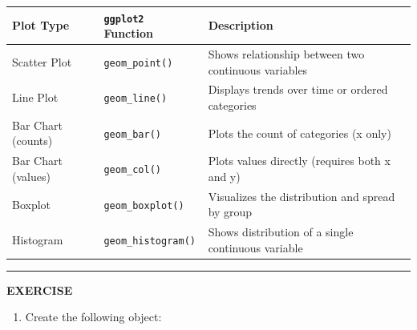 \documentclass[
]{book}
\providecommand{\tightlist}{%
  \setlength{\itemsep}{0pt}\setlength{\parskip}{0pt}}
\begin{document}
\begin{longtable}[]{@{}
  >{\raggedright\arraybackslash}p{}
  >{\raggedright\arraybackslash}p{}
  >{\raggedright\arraybackslash}p{}@{}}
\toprule\noalign{}
\begin{minipage}[b]{\linewidth}\raggedright
\textbf{Plot Type}
\end{minipage} & \begin{minipage}[b]{\linewidth}\raggedright
\textbf{\texttt{ggplot2} Function}
\end{minipage} & \begin{minipage}[b]{\linewidth}\raggedright
\textbf{Description}
\end{minipage} \\
\midrule\noalign{}
\endhead
\bottomrule\noalign{}
\endlastfoot
Scatter Plot & \texttt{geom\_point()} & Shows relationship between two continuous variables \\
Line Plot & \texttt{geom\_line()} & Displays trends over time or ordered categories \\
Bar Chart (counts) & \texttt{geom\_bar()} & Plots the count of categories (x only) \\
Bar Chart (values) & \texttt{geom\_col()} & Plots values directly (requires both x and y) \\
Boxplot & \texttt{geom\_boxplot()} & Visualizes the distribution and spread by group \\
Histogram & \texttt{geom\_histogram()} & Shows distribution of a single continuous variable \\
\end{longtable}

\begin{center}\rule{0.5\linewidth}{0.5pt}\end{center}

\textbf{EXERCISE}

\begin{enumerate}
\def\labelenumi{\arabic{enumi}.}
\tightlist
\item
  Create the following object:
\end{enumerate}
\end{document}
